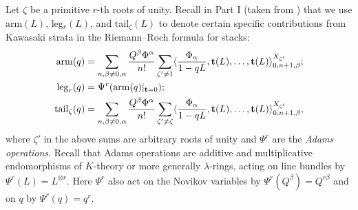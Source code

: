 \documentclass[11pt]{amsart}
\newtheorem*{main theorem*}{Main Theorem}
\theoremstyle{remark}
\numberwithin{equation}{section}
\begin{document}
Let $\zeta$ be a primitive $r$-th roots of unity. Recall in Part I (taken from \cite{Givental_Tonita_2011}) that we use arm$(L)$, leg$_{r}(L)$, and tail$_{\zeta}(L)$ to denote certain specific contributions from Kawasaki strata in the Riemann--Roch formula for stacks:
\begin{equation} \label{eqn_arm_leg_tail}
\begin{split}
    {\rm arm}(q) &= \sum_{n,\beta \neq 0,\alpha} \frac{Q^{\beta} \Phi^{\alpha}}{n!}\sum_{\zeta' \neq 1} \langle \frac{\Phi_{\alpha}}{1-qL}, \mathbf{t}(L),\dots,\mathbf{t}(L)  \rangle^{X_{\zeta'}}_{0,n+1,\beta} ;
    \\
    {\rm leg}_{r}(q) &= \Psi^r ({\rm arm}(q)|_{\mathbf{t}=0} );
    \\
    {\rm tail}_{\zeta}(q) &= \sum_{n,\beta \neq 0,\alpha} \frac{Q^{\beta} \Phi^{\alpha}}{n!}\sum_{\zeta' \neq \zeta} \langle \frac{\Phi_{\alpha}}{1-qL}, \mathbf{t}(L),\dots,\mathbf{t}(L)  \rangle^{X_{\zeta'}}_{0,n+1,\beta} ,
\end{split}
\end{equation}
where $\zeta'$ in the above sums are arbitrary roots of unity and
$\Psi^r$ are the \emph{Adams operations}. Recall that Adams operations are additive and multiplicative endomorphisms of $K$-theory or more generally $\lambda$-rings, acting on line bundles by $\Psi^r(L) = L^{\otimes r}$. Here $\Psi^r$ also act on the Novikov variables by $\Psi^r(Q^{\beta}) = Q^{r\beta}$ and on $q$ by $\Psi^r(q) = q^r$. 



\end{document}
